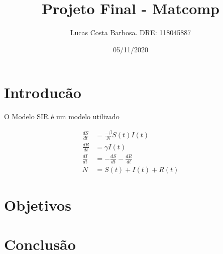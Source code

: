 \documentclass{article}
\title{Projeto Final - Matcomp}
\author{Lucas Costa Barbosa. DRE: 118045887 }
\date{05/11/2020}
\begin{document}
\maketitle

\section{Introducão}
O Modelo SIR é um modelo utilizado 



{\Large 
\begin{align}
\frac{dS}{dt} &=  \frac{-\beta}{N}{S(t)I(t)} \\
\frac{dR}{dt} &=  \gamma I(t) \\
\frac{dI}{dt} &= -\frac{dS}{dt}-\frac{dR}{dt} \\
N &= S(t)+I(t)+R(t)
\end{align}
}


\section{Objetivos}

\section{Conclusão}




\end{document}
